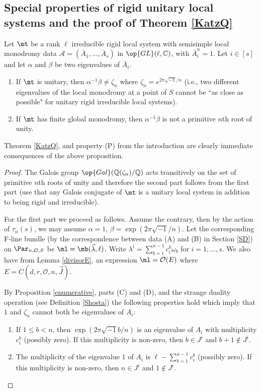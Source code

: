 \subsection{Special properties of rigid unitary local systems and the proof of Theorem \ref{KatzQ}} \label{KatzSection}
\begin{proposition}
\notready\label{propP}
Let $\mt$ be a rank $\ell$ irreducible rigid local system with semisimple local monodromy data
$\mathcal{A}=(\bar{A}_1,\dots,\bar{A}_s)$ in $\op{GL}(\ell,\Bbb{C})$, with $\bar{A}_i^n=1$. Let $i\in[s]$ and let $\alpha$ and $\beta$ be two eigenvalues of $\bar{A}_i$.
\begin{enumerate}
\item If $\mt$ is unitary, then $\alpha^{-1}\beta\neq \zeta_n$ where $\zeta_n=e^{2\pi\sqrt{-1}/n}$ (i.e., two different eigenvalues of the local monodromy at a point of $S$ cannot be ``as close as possible" for unitary rigid irreducible local systems).
\item If $\mt$ has finite global monodromy, then $\alpha^{-1}\beta$ is not a primitive $n$th root of unity.
\end{enumerate}
\end{proposition}
Theorem \ref{KatzQ}, and property (P) from the introduction are clearly  immediate consequences of the above proposition.
\begin{proof}
The Galois group $\op{Gal}(\Bbb{Q}(\zeta_n)/\Bbb{Q})$ acts transitively on the set of primitive $n$th roots of unity and therefore the second part follows from the first part (use that any Galois conjugate of $\mt$ is a unitary local system in addition to being rigid and irreducible).

For the first part we proceed as follows. Assume the contrary, then by the action of $\tau_n(s)$, we may assume $\alpha=1$, $\beta= \exp(2\pi \sqrt{-1}/n)$. Let the corresponding F-line bundle (by the correspondence between data  (A) and (B) in Section \ref{SD}) on $\Par_{n,\mathcal{O},S}$ be $\ml=\mb(\vec{\lambda},\ell)$. Write  $\lambda^i=\sum_{b=1}^{n-1}c^b_i\omega_b$ for $i=1,\dots,s$. We also have from Lemma \ref{divisorE}, an expression $\ml=\mathcal{O}(E)$ where  $E=C(d,r,\mathcal{O},n,\vec{J})$.

By Proposition \ref{enumerative}, parts (C) and (D), and the strange duality operation (see Definition \ref{Shosta}) the following properties hold which imply that $1$ and $\zeta_n$ cannot both be eigenvalues of $A_i$:
\begin{enumerate}
\item If  $1\leq b<n$,  then $\exp(2\pi\sqrt{-1}b/n)$ is an eigenvalue of $A_i$ with multiplicity $c^b_i$ (possibly zero). If this multiplicity is non-zero, then $b\in J^i$ and $b+1\not\in J^i$.
\item The multiplicity of the eigenvalue  $1$ of $A_i$ is  $\ell-\sum_{b=1}^{n-1}c^b_i$ (possibly zero). If this multiplicity is non-zero,  then $n\in J^i$ and $1\not\in J^i$.
\end{enumerate}
\end{proof}
